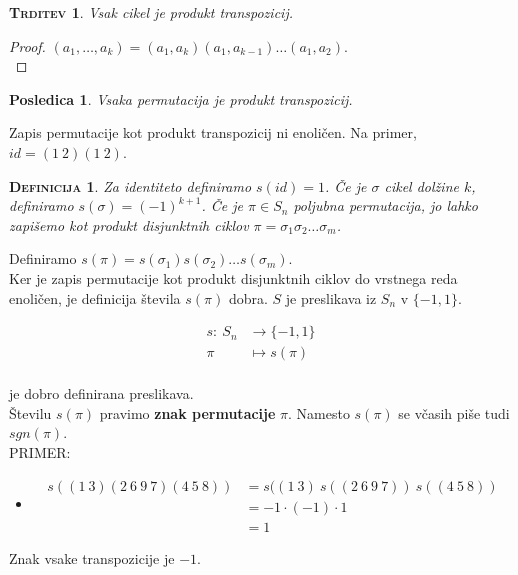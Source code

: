 \documentclass[a4paper,12pt]{article}
\newtheorem*{trditev}{\textsc{Trditev}}
\newtheorem*{posl}{Posledica}
\newtheorem*{definicija}{\textsc{Definicija}}
\begin{document}
\begin{trditev}
Vsak cikel je produkt transpozicij.\\
\end{trditev}

\begin{proof}
$(a_1,\ldots,a_k)=(a_1,a_k)(a_1,a_{k-1})\ldots(a_1,a_2)$. \\
\end{proof}

\begin{posl}
Vsaka permutacija je produkt transpozicij.\\
\end{posl}

\noindent Zapis permutacije kot produkt transpozicij ni enoličen. Na primer, $id=(1~2)(1~2)$.\\

\begin{definicija}
Za identiteto definiramo $s(id)=1$. Če je $\sigma$ cikel dolžine $k$, definiramo \linebreak $s(\sigma)=(-1)^{k+1}$. Če je $\pi \in S_n$ poljubna permutacija, jo lahko zapišemo kot produkt \linebreak disjunktnih ciklov $\pi=\sigma_1 \sigma_2 \ldots \sigma_m$. \\
\end{definicija}

\newpage 

\noindent Definiramo $s(\pi)=s(\sigma_1)s(\sigma_2)\ldots s(\sigma_m)$. \\

\noindent Ker je zapis permutacije kot produkt disjunktnih ciklov do vrstnega reda enoličen, je \linebreak definicija števila $s(\pi)$ dobra. $S$ je preslikava iz $S_n$ v $\{-1,1\}$.

\begin{align*}
s:~S_n & \rightarrow \{-1,1\} \\
\pi & \mapsto s(\pi) \\
\end{align*}

je dobro definirana preslikava. \\

\noindent Številu $s(\pi)$ pravimo \textbf{znak permutacije} $\pi$. Namesto $s(\pi)$ se včasih piše tudi $sgn(\pi)$.
\\

\noindent PRIMER:
\begin{itemize}
\item
\begin{align*}
s((1~3)(2~6~9~7)(4~5~8)) & = s((1~3)~s((2~6~9~7))~s((4~5~8))  \\ 
& = -1\cdot (-1)\cdot 1  \\
& = 1 
\end{align*}
\end{itemize}
Znak vsake transpozicije je $-1$. \\
\end{document}
